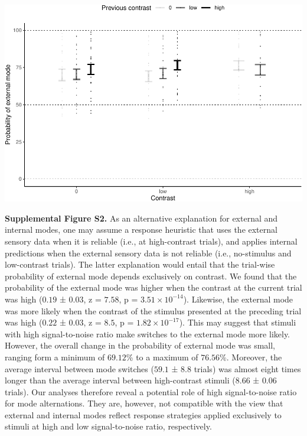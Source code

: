 \documentclass[
]{article}
\begin{document}
\includegraphics{predictive_templates_files/figure-latex/Supplemental_Figure_S2-1.pdf}

\textbf{Supplemental Figure S2.} As an alternative explanation for
external and internal modes, one may assume a response heuristic that
uses the external sensory data when it is reliable (i.e., at
high-contrast trials), and applies internal predictions when the
external sensory data is not reliable (i.e., no-stimulus and
low-contrast trials). The latter explanation would entail that the
trial-wise probability of external mode depends exclusively on contrast.
We found that the probability of the external mode was higher when the
contrast at the current trial was high (\(0.19\) ± \(0.03\), z =
\(7.58\), p = \(\ensuremath{3.51\times 10^{-14}}\)). Likewise, the
external mode was more likely when the contrast of the stimulus
presented at the preceding trial was high (\(0.22\) ± \(0.03\), z =
\(8.5\), p = \(\ensuremath{1.82\times 10^{-17}}\)). This may suggest
that stimuli with high signal-to-noise ratio make switches to the
external mode more likely. However, the overall change in the
probability of external mode was small, ranging form a minimum of
\(69.12\)\% to a maximum of \(76.56\)\%. Moreover, the average interval
between mode switches (\(59.1\) ± \(8.8\) trials) was almost eight times
longer than the average interval between high-contrast stimuli (\(8.66\)
± \(0.06\) trials). Our analyses therefore reveal a potential role of
high signal-to-noise ratio for mode alternations. They are, however, not
compatible with the view that external and internal modes reflect
response strategies applied exclusively to stimuli at high and low
signal-to-noise ratio, respectively.

\newpage
\end{document}
